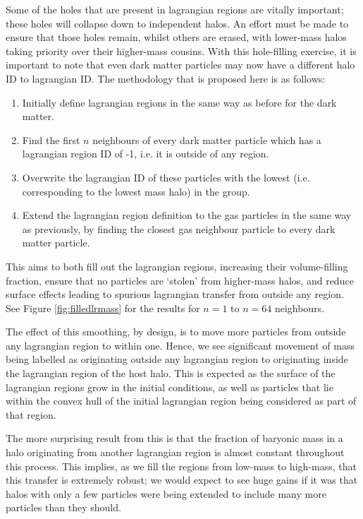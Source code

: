 Some of the holes that are present in lagrangian regions are vitally important;
these holes will collapse down to independent halos. An effort must be made to
ensure that those holes remain, whilst others are erased, with lower-mass halos
taking priority over their higher-mass cousins. With this hole-filling
exercise, it is important to note that even dark matter particles may now have
a different halo ID to lagrangian ID. The methodology that is proposed here is
as follows:
\begin{enumerate}
    \item Initially define lagrangian regions in the same way as before for
          the dark matter.
    \item Find the first $n$ neighbours of every dark matter particle which
          has a lagrangian region ID of -1, i.e. it is outside of any region.
    \item Overwrite the lagrangian ID of these particles with the lowest (i.e.
          corresponding to the lowest mass halo) in the group.
    \item Extend the lagrangian region definition to the gas particles in
          the same way as previously, by finding the closest gas neighbour
	  particle to every dark matter particle.
\end{enumerate}
This aims to both fill out the lagrangian regions, increasing their
volume-filling fraction, ensure that no particles are `stolen' from higher-mass
halos, and reduce surface effects leading to spurious lagrangian transfer from
outside any region. See Figure \ref{fig:filledlrmass} for the results for
$n=1$ to $n=64$ neighbours.

The effect of this smoothing, by design, is to move more particles from outside
any lagrangian region to within one. Hence, we see significant movement of
mass being labelled as originating outside any lagrangian region to originating
inside the lagrangian region of the host halo. This is expected as the surface
of the lagrangian regions grow in the initial conditions, as well as particles that
lie within the convex hull of the initial lagrangian region being considered as
part of that region.

The more surprising result from this is that the fraction of baryonic mass in a
halo originating from another lagrangian region is almost constant throughout
this process. This implies, as we fill the regions from low-mass to high-mass,
that this transfer is extremely robust; we would expect to see huge gains if
it was that halos with only a few particles were being extended to include many
more particles than they should.
